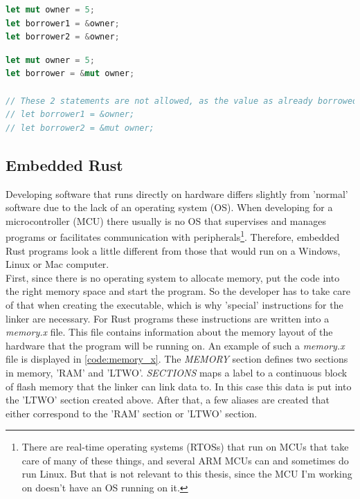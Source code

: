 \begin{minipage}{\textwidth}
\begin{lstlisting}[style=colorEX,language=Rust,caption={Simple example of an immutable borrow},label={code:borrow}]
let mut owner = 5;
let borrower1 = &owner;
let borrower2 = &owner;
\end{lstlisting}
\end{minipage}

\begin{minipage}{\textwidth}
\begin{lstlisting}[style=colorEX,language=Rust,caption={Simple example of a mutable borrow},label={code:mut_borrow}]
let mut owner = 5;
let borrower = &mut owner;

// These 2 statements are not allowed, as the value as already borrowed as mutable.
// let borrower1 = &owner;
// let borrower2 = &mut owner;
\end{lstlisting}
\end{minipage}

\subsection{Embedded Rust}

Developing software that runs directly on hardware differs slightly from 'normal' software due to the lack of an operating system (OS).
When developing for a microcontroller (MCU) there usually is no OS that supervises and manages programs or facilitates communication with peripherals\footnote
{There are real-time operating systems (RTOSs) that run on MCUs that take care of many of these things,
and several ARM MCUs can and sometimes do run Linux. But that is not relevant to this thesis, since the MCU I'm working on doesn't have an OS running on it.}.
Therefore, embedded Rust programs look a little different from those that would run on a Windows, Linux or Mac computer.
\\
First, since there is no operating system to allocate memory, put the code into the right memory space and start the program.
So the developer has to take care of that when creating the executable, which is why 'special' instructions for the linker are necessary.
For Rust programs these instructions are written into a \emph{memory.x} file.
This file contains information about the memory layout of the hardware that the program will be running on.
An example of such a \emph{memory.x} file is displayed in \ref{code:memory_x}.
The \emph{MEMORY} section defines two sections in memory, 'RAM' and 'LTWO'.
\emph{SECTIONS} maps a label to a continuous block of flash memory that the linker can link data to.
In this case this data is put into the 'LTWO' section created above.
After that, a few aliases are created that either correspond to the 'RAM' section or 'LTWO' section.

